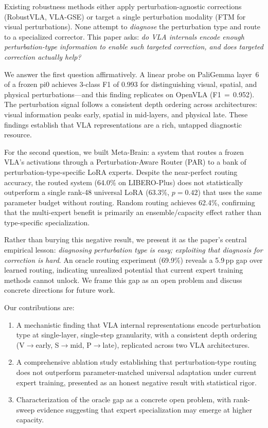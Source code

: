 \documentclass[letterpaper]{article}
\newcommand{\ours}{Meta-Brain}
\newcommand{\pp}{\,\text{pp}}
\begin{document}
Existing robustness methods either apply perturbation-agnostic corrections (RobustVLA, VLA-GSE) or target a single perturbation modality (FTM for visual perturbations). None attempt to \emph{diagnose} the perturbation type and route to a specialized corrector. This paper asks: \emph{do VLA internals encode enough perturbation-type information to enable such targeted correction, and does targeted correction actually help?}

We answer the first question affirmatively. A linear probe on PaliGemma layer~6 of a frozen pi0 achieves 3-class F1 of 0.993 for distinguishing visual, spatial, and physical perturbations---and this finding replicates on OpenVLA (F1\,$=$\,0.952). The perturbation signal follows a consistent depth ordering across architectures: visual information peaks early, spatial in mid-layers, and physical late. These findings establish that VLA representations are a rich, untapped diagnostic resource.

For the second question, we built \ours{}: a system that routes a frozen VLA's activations through a Perturbation-Aware Router (PAR) to a bank of perturbation-type-specific LoRA experts. Despite the near-perfect routing accuracy, the routed system (64.0\% on LIBERO-Plus) does not statistically outperform a single rank-48 universal LoRA (63.3\%, $p=0.42$) that uses the same parameter budget without routing. Random routing achieves 62.4\%, confirming that the multi-expert benefit is primarily an ensemble/capacity effect rather than type-specific specialization.

Rather than burying this negative result, we present it as the paper's central empirical lesson: \emph{diagnosing perturbation type is easy; exploiting that diagnosis for correction is hard}. An oracle routing experiment (69.9\%) reveals a 5.9$\pp$ gap over learned routing, indicating unrealized potential that current expert training methods cannot unlock. We frame this gap as an open problem and discuss concrete directions for future work.

Our contributions are:
\begin{enumerate}
    \item A mechanistic finding that VLA internal representations encode perturbation type at single-layer, single-step granularity, with a consistent depth ordering (V$\to$early, S$\to$mid, P$\to$late), replicated across two VLA architectures.
    \item A comprehensive ablation study establishing that perturbation-type routing does not outperform parameter-matched universal adaptation under current expert training, presented as an honest negative result with statistical rigor.
    \item Characterization of the oracle gap as a concrete open problem, with rank-sweep evidence suggesting that expert specialization may emerge at higher capacity.
\end{enumerate}
\end{document}
